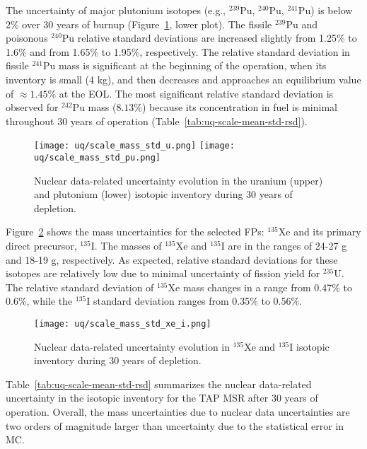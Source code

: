 The uncertainty of major plutonium isotopes (e.g., $^{239}$Pu, $^{240}$Pu, 
$^{241}$Pu) is below 2\% over 30 years of burnup 
(Figure~\ref{fig:uq-scale-u-pu}, lower plot). The fissile $^{239}$Pu and 
poisonous $^{240}$Pu relative standard deviations are increased slightly from 
1.25\% to 1.6\% and from 1.65\% to 1.95\%, respectively. The relative standard 
deviation in fissile $^{241}$Pu mass is significant at the beginning of the 
operation, when its inventory is small (4 kg), and then decreases and 
approaches an equilibrium value of $\approx1.45$\% at the \gls{EOL}. The 
most significant relative standard deviation is observed for $^{242}$Pu mass 
($8.13$\%) because its concentration in fuel is minimal throughout 30 years 
of operation (Table~\ref{tab:uq-scale-mean-std-rsd}).
\begin{figure}[hbp!] %
	\centering
	\texttt{[image: uq/scale\_mass\_std\_u.png]}
	\vspace{-12mm}
	\hspace{0.0mm}
	\texttt{[image: uq/scale\_mass\_std\_pu.png]}
	\vspace{+8mm}
	\caption{Nuclear data-related uncertainty evolution in the uranium (upper) 
		and plutonium (lower) isotopic inventory during 30 years of depletion.}
	\label{fig:uq-scale-u-pu}
\end{figure}

Figure~\ref{fig:uq-scale-xe-i} shows the mass uncertainties for the selected 
\glspl{FP}: $^{135}$Xe and its primary direct precursor, $^{135}$I. The masses 
of $^{135}$Xe and $^{135}$I are in the ranges of 24-27 g and 18-19 g, 
respectively. As expected, relative standard deviations for these isotopes are 
relatively low due to minimal uncertainty of fission yield for $^{235}$U. The 
relative standard deviation of $^{135}$Xe mass changes in a range from 
0.47\% to 0.6\%, while the $^{135}$I standard deviation ranges from 0.35\% to 
0.56\%.
\begin{figure}[hbp!] %
	\centering
	\texttt{[image: uq/scale\_mass\_std\_xe\_i.png]}
	\caption{Nuclear data-related uncertainty evolution in $^{135}$Xe and 
		$^{135}$I isotopic inventory during 30 years of depletion.}
	\label{fig:uq-scale-xe-i}
\end{figure}

Table~\ref{tab:uq-scale-mean-std-rsd} summarizes the nuclear data-related 
uncertainty in the isotopic inventory for the \gls{TAP} \gls{MSR} after 30 
years of operation. Overall, the mass uncertainties due to nuclear data 
uncertainties are two orders of magnitude larger than uncertainty due to 
the statistical error in \gls{MC}.  

